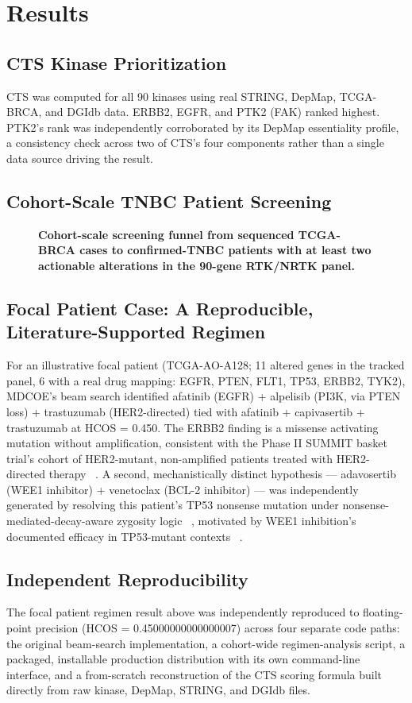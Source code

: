 \documentclass[10pt,letterpaper]{article}
\begin{document}
\section*{Results}

\subsection*{CTS Kinase Prioritization}
CTS was computed for all 90 kinases using real STRING, DepMap, TCGA-BRCA, and DGIdb data. ERBB2, EGFR, and PTK2 (FAK) ranked highest. PTK2's rank was independently corroborated by its DepMap essentiality profile, a consistency check across two of CTS's four components rather than a single data source driving the result.

\subsection*{Cohort-Scale TNBC Patient Screening}
\begin{figure}[!h]
\caption{\textbf{Cohort-scale screening funnel from sequenced TCGA-BRCA cases to confirmed-TNBC patients with at least two actionable alterations in the 90-gene RTK/NRTK panel.} }
\label{fig1}
\end{figure}

\subsection*{Focal Patient Case: A Reproducible, Literature-Supported Regimen}
For an illustrative focal patient (TCGA-AO-A128; 11 altered genes in the tracked panel, 6 with a real drug mapping: EGFR, PTEN, FLT1, TP53, ERBB2, TYK2), MDCOE's beam search identified afatinib (EGFR) + alpelisib (PI3K, via PTEN loss) + trastuzumab (HER2-directed) tied with afatinib + capivasertib + trastuzumab at HCOS = 0.450. The ERBB2 finding is a missense activating mutation without amplification, consistent with the Phase II SUMMIT basket trial's cohort of HER2-mutant, non-amplified patients treated with HER2-directed therapy ~\cite{bib8}. A second, mechanistically distinct hypothesis --- adavosertib (WEE1 inhibitor) + venetoclax (BCL-2 inhibitor) --- was independently generated by resolving this patient's TP53 nonsense mutation under nonsense-mediated-decay-aware zygosity logic ~\cite{bib9,bib10}, motivated by WEE1 inhibition's documented efficacy in TP53-mutant contexts ~\cite{bib11,bib12}.

\subsection*{Independent Reproducibility}
The focal patient regimen result above was independently reproduced to floating-point precision (HCOS = 0.45000000000000007) across four separate code paths: the original beam-search implementation, a cohort-wide regimen-analysis script, a packaged, installable production distribution with its own command-line interface, and a from-scratch reconstruction of the CTS scoring formula built directly from raw kinase, DepMap, STRING, and DGIdb files.
\end{document}
